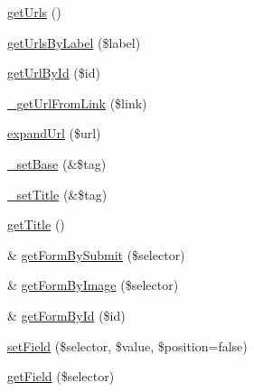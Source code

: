 \begin{DoxyCompactItemize}
\item 
\hyperlink{class_simple_page_ab8918b36cab735d972e9653ab16d27ff}{getUrls} ()
\item 
\hyperlink{class_simple_page_a1614d872793684018f3911cc7cad37c3}{getUrlsByLabel} (\$label)
\item 
\hyperlink{class_simple_page_a9989f73f4a3242fba33104b073cd8949}{getUrlById} (\$id)
\item 
\hyperlink{class_simple_page_a99994deae1c78806260a9c6b4efe638d}{\_\-getUrlFromLink} (\$link)
\item 
\hyperlink{class_simple_page_a1869ffc12c864603ecf18c0d07466e95}{expandUrl} (\$url)
\item 
\hyperlink{class_simple_page_a718984c5fe37d714c15320461ec06f6c}{\_\-setBase} (\&\$tag)
\item 
\hyperlink{class_simple_page_ae3b50ef1da0d1e177650ee8146394785}{\_\-setTitle} (\&\$tag)
\item 
\hyperlink{class_simple_page_a8cee582bd07bdc14ba5f9246e6600f2c}{getTitle} ()
\item 
\& \hyperlink{class_simple_page_a88cb8668be67ea78d4741b630708bd55}{getFormBySubmit} (\$selector)
\item 
\& \hyperlink{class_simple_page_a8a133c872f0f94987deb4193777a156e}{getFormByImage} (\$selector)
\item 
\& \hyperlink{class_simple_page_a3783c4aaa806bbd56f6787456ca45ddb}{getFormById} (\$id)
\item 
\hyperlink{class_simple_page_a03f791afb1690cd23e646142f3f25739}{setField} (\$selector, \$value, \$position=false)
\item 
\hyperlink{class_simple_page_afba361a0b510adad072c989e81e92e18}{getField} (\$selector)
\end{DoxyCompactItemize}
